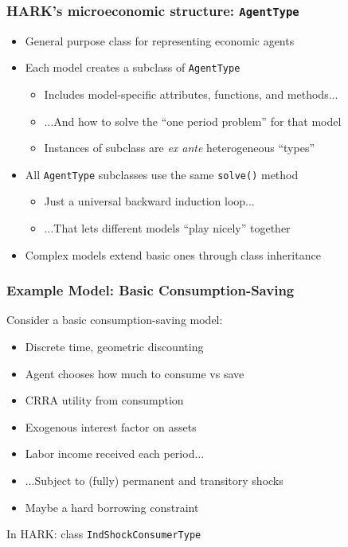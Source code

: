 \documentclass[11ptt]{beamer}
\newcommand{\bi}{\begin{itemize}}
\newcommand{\ei}{\end{itemize}}
\begin{document}
\begin{frame}
\frametitle{HARK's microeconomic structure: \texttt{AgentType}}
\bi
\item <1->General purpose class for representing economic agents

\item<1-> Each model creates a subclass of \texttt{AgentType}
\bi
\item Includes model-specific attributes, functions, and methods...

\item ...And how to solve the ``one period problem'' for that model

\item Instances of subclass are \textit{ex ante} heterogeneous ``types''
\ei
\item <2-> All \texttt{AgentType} subclasses use the same \texttt{solve()} method
\bi
\item Just a universal backward induction loop...

\item ...That lets different models ``play nicely'' together
\ei
\item <3->Complex models extend basic ones through class inheritance
\ei
\end{frame}




\begin{frame}\label{ModelStatement}
\frametitle{Example Model: Basic Consumption-Saving}

Consider a basic consumption-saving model: \hyperlink{ModelMath}{}
\begin{itemize}
\item Discrete time, geometric discounting

\item Agent chooses how much to consume vs save

\item CRRA utility from consumption

\item Exogenous interest factor on assets

\item Labor income received each period...

\item ...Subject to (fully) permanent and transitory shocks

\item Maybe a hard borrowing constraint
\end{itemize}

In HARK: class \texttt{IndShockConsumerType}

\end{frame}
\end{document}
